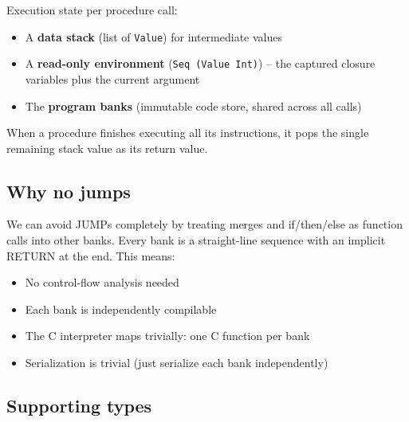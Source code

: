 \documentclass[]{article}
\begin{document}
Execution state per procedure call:

\begin{itemize}
\tightlist
\item
  A \textbf{data stack} (list of \texttt{Value}) for intermediate values
\item
  A \textbf{read-only environment} (\texttt{Seq\ (Value\ Int)}) -- the captured
  closure variables plus the current argument
\item
  The \textbf{program banks} (immutable code store, shared across all calls)
\end{itemize}

When a procedure finishes executing all its instructions, it pops the single
remaining stack value as its return value.

\subsection{Why no jumps}\label{why-no-jumps}

We can avoid JUMPs completely by treating merges and if/then/else as function
calls into other banks. Every bank is a straight-line sequence with an implicit
RETURN at the end. This means:

\begin{itemize}
\tightlist
\item
  No control-flow analysis needed
\item
  Each bank is independently compilable
\item
  The C interpreter maps trivially: one C function per bank
\item
  Serialization is trivial (just serialize each bank independently)
\end{itemize}

\subsection{Supporting types}\label{supporting-types}
\end{document}
